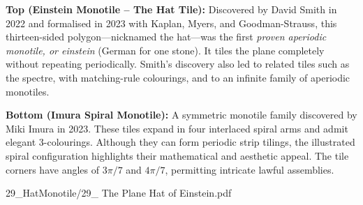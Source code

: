 \begin{SideNotePage}{
  \textbf{Top (Einstein Monotile – The Hat Tile):}  
  Discovered by David Smith in 2022 and formalised in 2023 with Kaplan, Myers, and Goodman-Strauss, this thirteen-sided polygon—nicknamed the \QSOpen{}hat\QSClose{}—was the first \textit{proven aperiodic monotile, or einstein} (German for \QSOpen{}one stone\QSClose{}). It tiles the plane completely without repeating periodically. Smith’s discovery also led to related tiles such as the \QSOpen{}spectre,\QSClose{} with matching-rule colourings, and to an infinite family of aperiodic monotiles. \par

  \textbf{Bottom (Imura Spiral Monotile):}  
  A symmetric monotile family discovered by Miki Imura in 2023. These tiles expand in four interlaced spiral arms and admit elegant 3-colourings. Although they can form periodic strip tilings, the illustrated spiral configuration highlights their mathematical and aesthetic appeal. The tile corners have angles of $3\pi/7$ and $4\pi/7$, permitting intricate lawful assemblies. \par

}{29_HatMonotile/29_ The Plane Hat of Einstein.pdf}
\end{SideNotePage}
